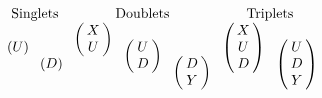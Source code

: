 \begin{table}[htb]
\begin{eqnarray*}
\setlength{\arraycolsep}{2pt}
\begin{array}{cccccccc}
&\multicolumn{2}{c}{\mbox{Singlets}}&\multicolumn{3}{c}{\mbox{Doublets}}&\multicolumn{2}{c}{\mbox{Triplets}}\\
& 
\begin{array}{c} ~ \\ (U) \\ ~ \\ ~ \end{array} &
\begin{array}{c} ~ \\ ~ \\ (D) \\ ~ \end{array} & 
\begin{array}{c} \left(\begin{array}{c} X \\ U \end{array}\right) \\ ~ \\ ~ \end{array} &
\begin{array}{c} ~ \\ \left(\begin{array}{c} U \\ D \end{array}\right) \\ ~ \end{array} &
\begin{array}{c} ~ \\ ~ \\ \left(\begin{array}{c} D \\ Y \end{array}\right) \end{array} & 
\begin{array}{c} \left(\begin{array}{c} X \\ U \\ D \end{array}\right) \\ ~ \end{array} &
\begin{array}{c} ~ \\ \left(\begin{array}{c} U \\ D \\ Y \end{array}\right) \end{array} \\

\end{array}
\end{eqnarray*}
\end{table}
